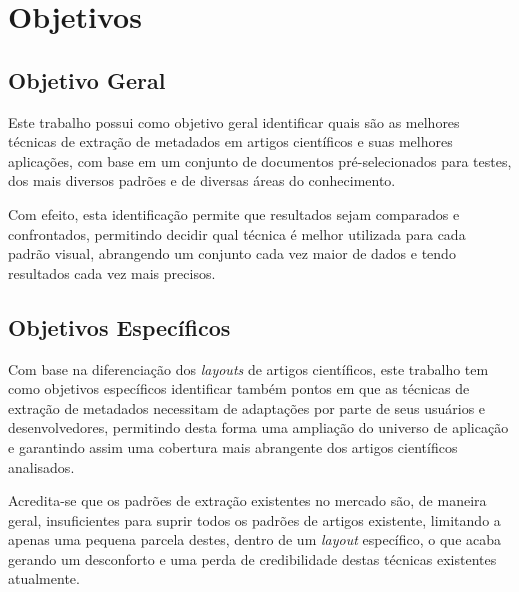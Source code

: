 \section{Objetivos}
\label{sec:goals}

\subsection{Objetivo Geral}
\label{ssec:main-goal}

Este trabalho possui como objetivo geral identificar quais são as melhores técnicas de extração de metadados em artigos científicos e suas melhores aplicações, com base em um conjunto de documentos pré-selecionados para testes, dos mais diversos padrões e de diversas áreas do conhecimento.

Com efeito, esta identificação permite que resultados sejam comparados e confrontados, permitindo decidir qual técnica é melhor utilizada para cada padrão visual, abrangendo um conjunto cada vez maior de dados e tendo resultados cada vez mais precisos.


\subsection{Objetivos Específicos}
\label{ssec:specific-goals}

Com base na diferenciação dos \textit{layouts} de artigos científicos, este trabalho tem como objetivos específicos identificar também pontos em que as técnicas de extração de metadados necessitam de adaptações por parte de seus usuários e desenvolvedores, permitindo desta forma uma ampliação do universo de aplicação e garantindo assim uma cobertura mais abrangente dos artigos científicos analisados.

Acredita-se que os padrões de extração existentes no mercado são, de maneira geral, insuficientes para suprir todos os padrões de artigos existente, limitando a apenas uma pequena parcela destes, dentro de um \textit{layout} específico, o que acaba gerando um desconforto e uma perda de credibilidade destas técnicas existentes atualmente.


